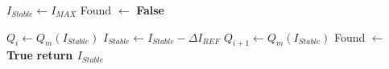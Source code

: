 \begin{algorithmic}[1]


\State $I_{Stable} \gets I_{MAX}$ 
\State Found $\gets$ \textbf{False}

    
    \State $Q_i \gets Q_m(I_{Stable})$
    \State $I_{Stable} \gets I_{Stable}  - \Delta I_{REF}$
    \State $Q_{i+1} \gets Q_m(I_{Stable})$
        \State Found $\gets$ \textbf{True}
    \EndIf
\EndWhile
\State \textbf{return $I_{Stable}$}
\end{algorithmic}